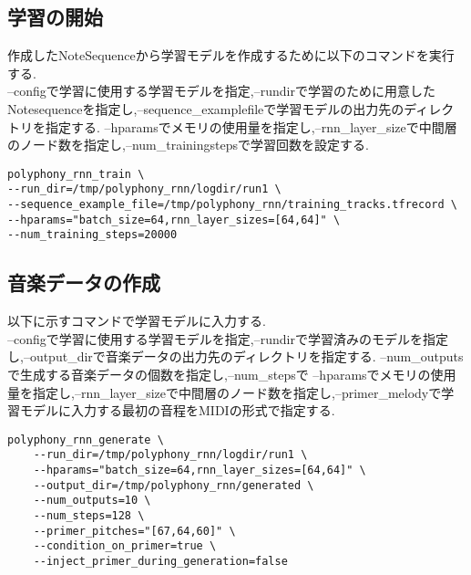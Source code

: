 \subsection{学習の開始}
作成したNoteSequenceから学習モデルを作成するために以下のコマンドを実行する.\\
--configで学習に使用する学習モデルを指定,--rundirで学習のために用意したNotesequenceを指定し,--sequence\_examplefileで学習モデルの出力先のディレクトリを指定する.
--hparamsでメモリの使用量を指定し,--rnn\_layer\_sizeで中間層のノード数を指定し,--num\_trainingstepsで学習回数を設定する.\\
\begin{lstlisting}[basicstyle=\ttfamily\footnotesize,frame=single]
polyphony_rnn_train \
--run_dir=/tmp/polyphony_rnn/logdir/run1 \
--sequence_example_file=/tmp/polyphony_rnn/training_tracks.tfrecord \
--hparams="batch_size=64,rnn_layer_sizes=[64,64]" \
--num_training_steps=20000
\end{lstlisting}
\subsection{音楽データの作成}
以下に示すコマンドで学習モデルに入力する.\\
--configで学習に使用する学習モデルを指定,--rundirで学習済みのモデルを指定し,--output\_dirで音楽データの出力先のディレクトリを指定する.
--num\_outputsで生成する音楽データの個数を指定し,--num\_stepsで
--hparamsでメモリの使用量を指定し,--rnn\_layer\_sizeで中間層のノード数を指定し,--primer\_melodyで学習モデルに入力する最初の音程をMIDIの形式で指定する.\\
\begin{lstlisting}[basicstyle=\ttfamily\footnotesize,frame=single]
    polyphony_rnn_generate \
    --run_dir=/tmp/polyphony_rnn/logdir/run1 \
    --hparams="batch_size=64,rnn_layer_sizes=[64,64]" \
    --output_dir=/tmp/polyphony_rnn/generated \
    --num_outputs=10 \
    --num_steps=128 \
    --primer_pitches="[67,64,60]" \
    --condition_on_primer=true \
    --inject_primer_during_generation=false
\end{lstlisting}